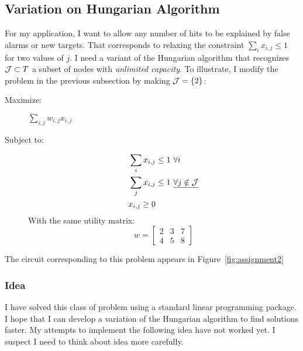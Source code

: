 \documentclass[11pt]{article}
\begin{document}
\subsection{Variation on Hungarian Algorithm}
\label{sec:variation}

For my application, I want to allow any number of hits to be explained
by false alarms or new targets.  That corresponds to relaxing the
constraint $\sum_i x_{i,j} \leq 1$ for two values of $j$.  I need a
variant of the Hungarian algorithm that recognizes ${\cal J} \subset
T$ a subset of nodes with \emph{unlimited capacity}.  To illustrate, I
modify the problem in the previous subsection by making ${\cal J} =
\left\{2\right\}$:
\begin{description}
\item[Maximize:] $\sum_{i,j} w_{i,j} x_{i,j}$
\item[Subject to:]
  \begin{align*}
    \sum_i x_{i,j} &\leq 1 ~\forall i\\
    \sum_j x_{i,j} &\leq 1  ~\underline{\forall j \notin {\cal J}} \\
    x_{i,j} \geq 0
  \end{align*}
With the same utility matrix:
\begin{equation*}
  w =
  \begin{bmatrix}
    2 & 3 & 7 \\
    4 & 5 & 8
  \end{bmatrix}
\end{equation*}
\end{description}

The circuit corresponding to this problem appears in
Figure~\ref{fig:assignment2}
\begin{figure*}
  \centering
  \caption{Circuit equivalent of the assignment problem with no
    restriction on the number of $i$ nodes assigned to node $j=0$.}
  \label{fig:assignment2}
\end{figure*}

\subsubsection{Idea}
\label{sec:idea}

I have solved this class of problem using a standard linear
programming package.  I hope that I can develop a variation of the
Hungarian algorithm to find solutions faster.  My attempts to
implement the following idea have not worked yet.  I suspect I need to
think about idea more carefully.
\end{document}
